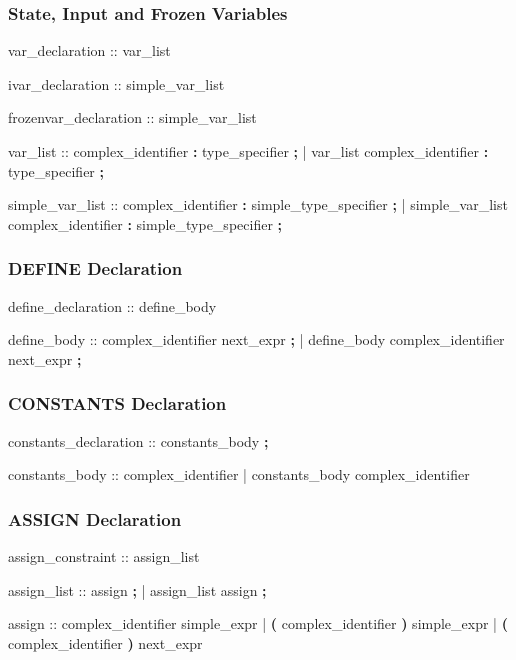 \subsubsection{State, Input and Frozen Variables}
\begin{Grammar}
var_declaration ::  var_list

ivar_declaration ::  simple_var_list

frozenvar_declaration ::  simple_var_list

var_list :: complex_identifier \textbf{:} type_specifier \textbf{;} 
          | var_list complex_identifier \textbf{:} type_specifier \textbf{;} 

simple_var_list :: complex_identifier \textbf{:} simple_type_specifier \textbf{;} 
      | simple_var_list complex_identifier \textbf{:} simple_type_specifier \textbf{;} 
\end{Grammar}


\subsubsection{DEFINE Declaration}
\begin{Grammar}
define_declaration ::  define_body

define_body :: complex_identifier \operator{:=} next_expr \textbf{;}
             | define_body complex_identifier \operator{:=} next_expr \textbf{;}
\end{Grammar}


\subsubsection{CONSTANTS Declaration}
\begin{Grammar}
constants_declaration ::  constants_body \textbf{;}

constants_body :: complex_identifier 
             | constants_body  \operator{,} complex_identifier
\end{Grammar}


\subsubsection{ASSIGN Declaration}
\begin{Grammar}
assign_constraint ::  assign_list

assign_list :: assign \textbf{;}
             | assign_list assign \textbf{;}

assign ::
    complex_identifier          \operator{:=} simple_expr
  |  \textbf{(} complex_identifier \textbf{)} \operator{:=} simple_expr
  |  \textbf{(} complex_identifier \textbf{)} \operator{:=} next_expr
\end{Grammar}


